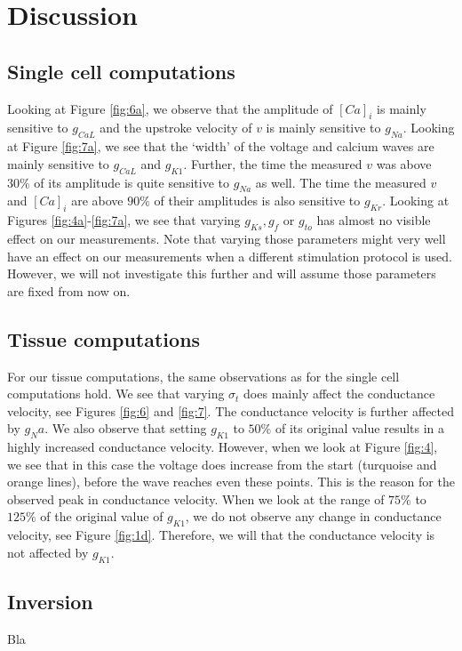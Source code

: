 \documentclass{article}
\begin{document}
\section{Discussion} \label{Discussion}
\subsection{Single cell computations} \label{Single cell computations 2}
Looking at Figure \ref{fig:6a}, we observe that the amplitude of $[Ca]_i$ is mainly sensitive to $g_{CaL}$ and the upstroke velocity of $v$ is mainly sensitive to $g_{Na}$. Looking at Figure \ref{fig:7a}, we see that the `width' of the voltage and calcium waves are mainly sensitive to $g_{CaL}$ and $g_{K1}$. Further, the time the measured $v$ was above $30\%$ of its amplitude is quite sensitive to $g_{Na}$ as well. The time the measured $v$ and $[Ca]_i$ are above $90\%$ of their amplitudes is also sensitive to $g_{Kr}$. Looking at Figures \ref{fig:4a}-\ref{fig:7a}, we see that varying $g_{Ks}, g_{f}$ or $g_{to}$ has almost no visible effect on our measurements. Note that varying those parameters might very well have an effect on our measurements when a different stimulation protocol is used. However, we will not investigate this further and will assume those parameters are fixed from now on. 
%
\subsection{Tissue computations} \label{Tissue computations 2}
%
For our tissue computations, the same observations as for the single cell computations hold. We see that varying $\sigma_t$ does mainly affect the conductance velocity, see Figures \ref{fig:6} and \ref{fig:7}. The conductance velocity is further affected by $g_Na$. We also observe that setting $g_{K1}$ to $50\%$ of its original value results in a highly increased conductance velocity. However, when we look at Figure \ref{fig:4}, we see that in this case the voltage does increase from the start (turquoise and orange lines), before the wave reaches even these points. This is the reason for the observed peak in conductance velocity. When we look at the range of $75\%$ to $125\%$ of the original value of $g_{K1}$, we do not observe any change in conductance velocity, see Figure \ref{fig:1d}. Therefore, we will that the conductance velocity is not affected by $g_{K1}$.
%
\subsection{Inversion} \label{Inversion 2}
%
Bla
%
\end{document}
